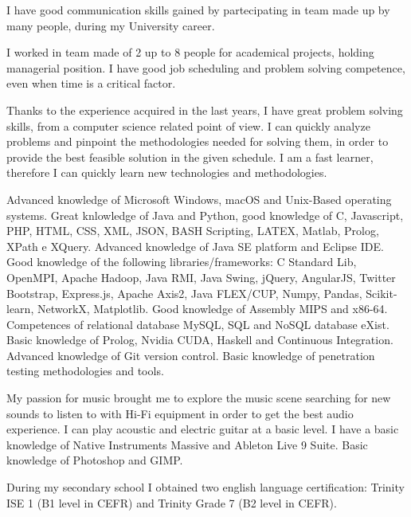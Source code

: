 \documentclass[helvetica,english,logo,notitle,totpages,utf8]{europecv2013}
\begin{document}
\begin{europecv}

\ecvlanguageheader
{}


\ecvlanguagefooter[5pt]

{
I have good communication skills gained by partecipating in team made up by many people, during my University career.
}

{I worked in team made of 2 up to 8 people for academical projects, holding managerial position. I have good job scheduling and problem solving competence, even when time is a critical factor.}

{Thanks to the experience acquired in the last years, I have great problem solving skills, from a computer science related point of view. I can quickly analyze problems and pinpoint the methodologies needed for solving them, in order to provide the best feasible solution in the given schedule. I am a fast learner, therefore I can quickly learn new technologies and methodologies.}

{Advanced knowledge of Microsoft Windows, macOS and Unix-Based operating systems. Great knlowledge of Java and Python, good knowledge of C, Javascript, PHP, HTML, CSS, XML, JSON, BASH Scripting, LATEX, Matlab, Prolog, XPath e XQuery. Advanced knowledge of Java SE platform and Eclipse IDE. Good knowledge of the following libraries/frameworks: C Standard Lib, OpenMPI, Apache Hadoop, Java RMI, Java Swing, jQuery, AngularJS, Twitter Bootstrap, Express.js, Apache Axis2, Java FLEX/CUP, Numpy, Pandas, Scikit-learn, NetworkX, Matplotlib. Good knowledge of Assembly MIPS and x86-64. Competences of relational database MySQL, SQL and NoSQL database eXist. Basic knowledge of Prolog, Nvidia CUDA, Haskell and Continuous Integration. Advanced knowledge of Git version control. Basic knowledge of penetration testing methodologies and tools.}


{My passion for music brought me to explore the music scene searching for new sounds to listen to with Hi-Fi equipment in order to get the best audio experience. I can play acoustic and electric guitar at a basic level. I have a basic knowledge of Native Instruments Massive and Ableton Live 9 Suite. Basic knowledge of Photoshop and GIMP.
{\par\vspace{3pt}
During my secondary school I obtained two english language certification: Trinity ISE 1 (B1 level in CEFR) and Trinity Grade 7 (B2 level in CEFR).}
}




\end{europecv}
\end{document}
